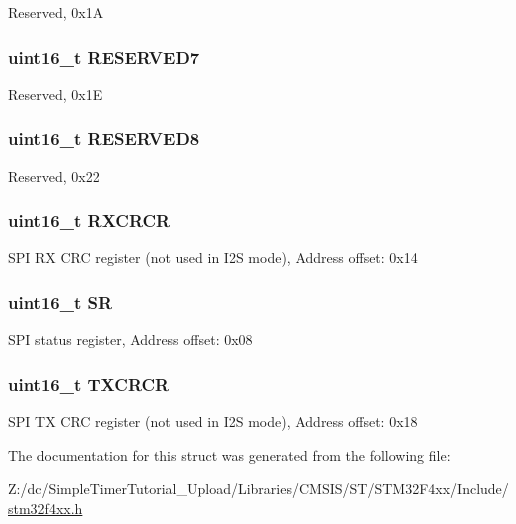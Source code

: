 Reserved, 0x1\-A \hypertarget{struct_s_p_i___type_def_ab1820c97e368d349f5f4121f015d9fab}{
\subsubsection[{R\-E\-S\-E\-R\-V\-E\-D7}]{\setlength{\rightskip}{0pt plus 5cm}uint16\-\_\-t R\-E\-S\-E\-R\-V\-E\-D7}}\label{struct_s_p_i___type_def_ab1820c97e368d349f5f4121f015d9fab}
Reserved, 0x1\-E \hypertarget{struct_s_p_i___type_def_afc22764fbf9ee7ce28174d65d0260f18}{
\subsubsection[{R\-E\-S\-E\-R\-V\-E\-D8}]{\setlength{\rightskip}{0pt plus 5cm}uint16\-\_\-t R\-E\-S\-E\-R\-V\-E\-D8}}\label{struct_s_p_i___type_def_afc22764fbf9ee7ce28174d65d0260f18}
Reserved, 0x22 \hypertarget{struct_s_p_i___type_def_a7ad53aa3735ccdd785e3eec02faf5eb9}{
\subsubsection[{R\-X\-C\-R\-C\-R}]{ uint16\-\_\-t R\-X\-C\-R\-C\-R}}\label{struct_s_p_i___type_def_a7ad53aa3735ccdd785e3eec02faf5eb9}
S\-P\-I R\-X C\-R\-C register (not used in I2\-S mode), Address offset\-: 0x14 \hypertarget{struct_s_p_i___type_def_a44962ea5442d203bf4954035d1bfeb9d}{
\subsubsection[{S\-R}]{ uint16\-\_\-t S\-R}}\label{struct_s_p_i___type_def_a44962ea5442d203bf4954035d1bfeb9d}
S\-P\-I status register, Address offset\-: 0x08 \hypertarget{struct_s_p_i___type_def_a0238d40f977d03709c97033b8379f98f}{
\subsubsection[{T\-X\-C\-R\-C\-R}]{ uint16\-\_\-t T\-X\-C\-R\-C\-R}}\label{struct_s_p_i___type_def_a0238d40f977d03709c97033b8379f98f}
S\-P\-I T\-X C\-R\-C register (not used in I2\-S mode), Address offset\-: 0x18 

The documentation for this struct was generated from the following file\-:\begin{DoxyCompactItemize}
\item 
Z\-:/dc/\-Simple\-Timer\-Tutorial\-\_\-\-Upload/\-Libraries/\-C\-M\-S\-I\-S/\-S\-T/\-S\-T\-M32\-F4xx/\-Include/\hyperlink{stm32f4xx_8h}{stm32f4xx.\-h}\end{DoxyCompactItemize}
